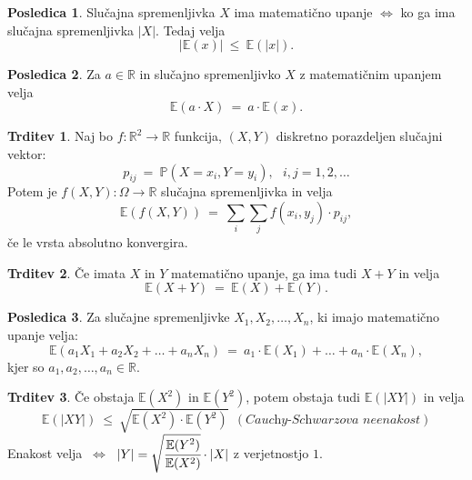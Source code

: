 \documentclass[11pt]{article}
\theoremstyle{definition}
\theoremstyle{definition}
\newtheorem{trditev}{Trditev}[section]
\theoremstyle{definition}
\newtheorem*{posledica}{Posledica}
\begin{document}
\begin{posledica}

Slučajna spremenljivka $X$ ima matematično upanje $\iff$ ko ga ima slučajna spremenljivka $|X|$. Tedaj velja
$$|\mathbb{E}(x)| ~\leq~ \mathbb{E}(|x|).$$

\end{posledica}
\vspace{0.5cm}

\begin{posledica}

Za $a \in \mathbb{R}$ in slučajno spremenljivko $X$ z matematičnim upanjem velja
$$\mathbb{E}(a \cdot X) ~=~ a \cdot \mathbb{E}(x).$$ 

\end{posledica}
\vspace{0.5cm}

\begin{trditev}

Naj bo $f: \mathbb{R}^2 \rightarrow \mathbb{R}$ funkcija, $(X, Y)$ diskretno porazdeljen slučajni vektor:
$$p_{ij} ~=~ \mathbb{P}(X = x_i, Y = y_i), ~~~i,j = 1, 2, \ldots$$
Potem je $f(X, Y): \Omega \rightarrow \mathbb{R}$ slučajna spremenljivka in velja
$$\mathbb{E}(f(X, Y)) ~=~ \sum_i \sum_j f(x_i, y_j) \cdot p_{ij},$$
če le vrsta absolutno konvergira.

\end{trditev}
\vspace{0.5cm}

\begin{trditev}

Če imata $X$ in $Y$ matematično upanje, ga ima tudi $X + Y$ in velja
$$\mathbb{E}(X + Y) ~=~ \mathbb{E}(X) + \mathbb{E}(Y).$$

\end{trditev}
\vspace{0.5cm}

\begin{posledica}

Za slučajne spremenljivke $X_1, X_2, \ldots, X_n$, ki imajo matematično upanje velja:
$$\mathbb{E}(a_1 X_1 + a_2 X_2 + \ldots + a_n X_n) ~=~ a_1 \cdot \mathbb{E}(X_1) + \ldots + a_n \cdot \mathbb{E}(X_n),$$
kjer so $a_1, a_2, \ldots, a_n \in \mathbb{R}$.

\end{posledica}
\vspace{0.5cm}

\begin{trditev}

Če obstaja $\mathbb{E}(X^2)$ in $\mathbb{E}(Y^2)$, potem obstaja tudi $\mathbb{E}(|XY|)$ in velja
$$\mathbb{E}(|XY|) ~\leq~ \sqrt{\mathbb{E}(X^2) \cdot \mathbb{E}(Y^2)} ~~(\textit{Cauchy-Schwarzova neenakost})$$
Enakost velja $~\iff~$ $|Y| = \sqrt{\cfrac{\mathbb{E}(Y^2)}{\mathbb{E}(X^2)}} \cdot |X|$ z verjetnostjo $1$.

\end{trditev}
\vspace{0.5cm}
\end{document}
